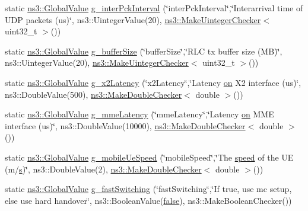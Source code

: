 \begin{DoxyCompactItemize}
\item 
static \hyperlink{classns3_1_1GlobalValue}{ns3\+::\+Global\+Value} \hyperlink{mc-twoenbs_8cc_ab17a4b9687b84ef916bf3b1f093684c8}{g\+\_\+inter\+Pck\+Interval} (\char`\"{}inter\+Pck\+Interval\char`\"{},\char`\"{}Interarrival time of U\+DP packets (us)\char`\"{}, ns3\+::\+Uinteger\+Value(20), \hyperlink{namespacens3_aed274764da411ed9397a3524a7c9abb8}{ns3\+::\+Make\+Uinteger\+Checker}$<$ uint32\+\_\+t $>$())
\item 
static \hyperlink{classns3_1_1GlobalValue}{ns3\+::\+Global\+Value} \hyperlink{mc-twoenbs_8cc_a0dd834a9f12c707454eb896255890f14}{g\+\_\+buffer\+Size} (\char`\"{}buffer\+Size\char`\"{},\char`\"{}R\+LC tx buffer size (MB)\char`\"{}, ns3\+::\+Uinteger\+Value(20), \hyperlink{namespacens3_aed274764da411ed9397a3524a7c9abb8}{ns3\+::\+Make\+Uinteger\+Checker}$<$ uint32\+\_\+t $>$())
\item 
static \hyperlink{classns3_1_1GlobalValue}{ns3\+::\+Global\+Value} \hyperlink{mc-twoenbs_8cc_a6bef83702297af986c679ca3d5c220aa}{g\+\_\+x2\+Latency} (\char`\"{}x2\+Latency\char`\"{},\char`\"{}Latency \hyperlink{lte__link__budget__x2__handover__measures_8m_ac88aa5a5c67076097e4a0e87a0709ea0}{on} X2 interface (us)\char`\"{}, ns3\+::\+Double\+Value(500), \hyperlink{namespacens3_a0f8000e7b66dd988358648f0b16c7709}{ns3\+::\+Make\+Double\+Checker}$<$ double $>$())
\item 
static \hyperlink{classns3_1_1GlobalValue}{ns3\+::\+Global\+Value} \hyperlink{mc-twoenbs_8cc_a69a2f99ec021e0807e2881cf7ec0fe53}{g\+\_\+mme\+Latency} (\char`\"{}mme\+Latency\char`\"{},\char`\"{}Latency \hyperlink{lte__link__budget__x2__handover__measures_8m_ac88aa5a5c67076097e4a0e87a0709ea0}{on} M\+ME interface (us)\char`\"{}, ns3\+::\+Double\+Value(10000), \hyperlink{namespacens3_a0f8000e7b66dd988358648f0b16c7709}{ns3\+::\+Make\+Double\+Checker}$<$ double $>$())
\item 
static \hyperlink{classns3_1_1GlobalValue}{ns3\+::\+Global\+Value} \hyperlink{mc-twoenbs_8cc_afaf43b629c3b9916254a5c4b25053ea6}{g\+\_\+mobile\+Ue\+Speed} (\char`\"{}mobile\+Speed\char`\"{},\char`\"{}The \hyperlink{mmwave-amc-test_8cc_a6dc6e6f3c75c509ce943163afb5dade7}{speed} of the UE (m/\hyperlink{generate__test__data__lte__sinr_8m_ad83eeb3a142285d1243a08c6b7026df8}{s})\char`\"{}, ns3\+::\+Double\+Value(2), \hyperlink{namespacens3_a0f8000e7b66dd988358648f0b16c7709}{ns3\+::\+Make\+Double\+Checker}$<$ double $>$())
\item 
static \hyperlink{classns3_1_1GlobalValue}{ns3\+::\+Global\+Value} \hyperlink{mc-twoenbs_8cc_a22575b3b732d4e3b97a32f9cbc9a78c3}{g\+\_\+fast\+Switching} (\char`\"{}fast\+Switching\char`\"{},\char`\"{}If true, use mc setup, else use hard handover\char`\"{}, ns3\+::\+Boolean\+Value(\hyperlink{lte__cqi__generation_8m_ab1bef239d413c4da139c4bac92cd657a}{false}), ns3\+::\+Make\+Boolean\+Checker())

\end{DoxyCompactItemize}
